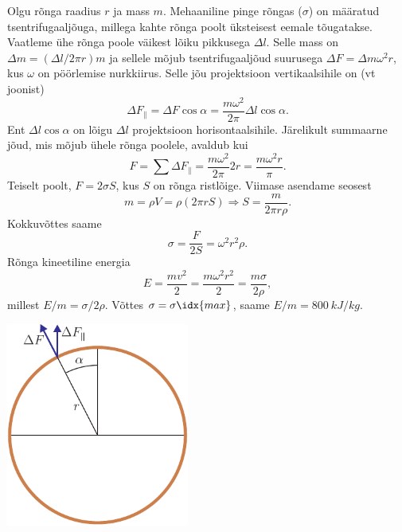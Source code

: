 \documentclass[10pt]{article}
\begin{document}
{\osa Olgu rõnga raadius $r$ ja mass $m$. Mehaaniline pinge rõngas ($\sigma$) on määratud tsentrifugaaljõuga, millega kahte rõnga poolt üksteisest eemale tõugatakse. Vaatleme ühe rõnga poole väikest lõiku pikkusega $\Delta l$. Selle mass on $\Delta m = (\Delta l/2\pi r)m$ ja sellele mõjub tsentrifugaaljõud suurusega $\Delta F = \Delta m\omega^2 r$, kus $\omega$ on pöörlemise nurkkiirus. Selle jõu projektsioon vertikaalsihile on (vt joonist)
\[
\Delta F_{ \|}=\Delta F \cos \alpha=\frac{m \omega^{2}}{2 \pi} \Delta l \cos \alpha.
\]
Ent $\Delta l \cos \alpha$ on lõigu $\Delta l$ projektsioon horisontaalsihile. Järelikult summaarne jõud, mis mõjub ühele rõnga poolele, avaldub kui
\[
F=\sum \Delta F_{ \|}=\frac{m \omega^{2}}{2 \pi} 2 r=\frac{m \omega^{2} r}{\pi}.
\]
Teiselt poolt, $F = 2\sigma S$, kus $S$ on rõnga ristlõige. Viimase asendame seosest
\[
m=\rho V=\rho(2 \pi r S) \Rightarrow S=\frac{m}{2 \pi r \rho}.
\]
Kokkuvõttes saame
\[
\sigma = \frac{F}{2S} = \omega^2 r^2 \rho.
\]
Rõnga kineetiline energia
\[
E = \frac{mv^2}{2} = \frac{m\omega^2r^2}{2} = \frac{m\sigma}{2\rho},
\]
millest $E/m = \sigma /2\rho$. Võttes $\sigma = \sigma\idx{max}$, saame $E/m = \SI{800}{kJ/kg}$.

\begin{center}
	\includegraphics[width=0.45\textwidth]{2007-v3g-04-yl}
\end{center}
\probend
\bigskip


}
\end{document}
